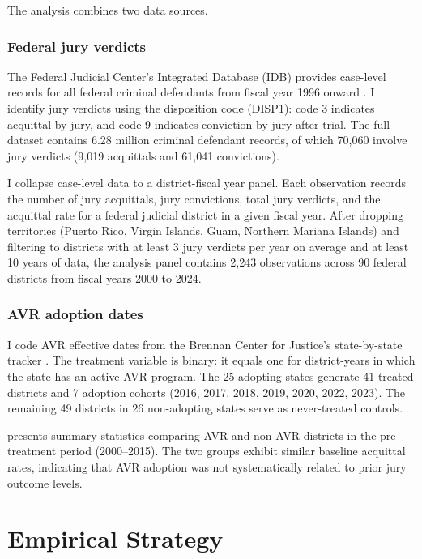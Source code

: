 \documentclass[12pt]{article}
\begin{document}
The analysis combines two data sources.

\subsubsection*{Federal jury verdicts} The Federal Judicial Center's Integrated Database (IDB) provides case-level records for all federal criminal defendants from fiscal year 1996 onward \citep{fjcidb2024}. I identify jury verdicts using the disposition code (DISP1): code 3 indicates acquittal by jury, and code 9 indicates conviction by jury after trial. The full dataset contains 6.28 million criminal defendant records, of which 70,060 involve jury verdicts (9,019 acquittals and 61,041 convictions).

I collapse case-level data to a district-fiscal year panel. Each observation records the number of jury acquittals, jury convictions, total jury verdicts, and the acquittal rate for a federal judicial district in a given fiscal year. After dropping territories (Puerto Rico, Virgin Islands, Guam, Northern Mariana Islands) and filtering to districts with at least 3 jury verdicts per year on average and at least 10 years of data, the analysis panel contains 2,243 observations across 90 federal districts from fiscal years 2000 to 2024.

\subsubsection*{AVR adoption dates} I code AVR effective dates from the Brennan Center for Justice's state-by-state tracker \citep{brennan2023avr}. The treatment variable is binary: it equals one for district-years in which the state has an active AVR program. The 25 adopting states generate 41 treated districts and 7 adoption cohorts (2016, 2017, 2018, 2019, 2020, 2022, 2023). The remaining 49 districts in 26 non-adopting states serve as never-treated controls.



 presents summary statistics comparing AVR and non-AVR districts in the pre-treatment period (2000--2015). The two groups exhibit similar baseline acquittal rates, indicating that AVR adoption was not systematically related to prior jury outcome levels.

\section{Empirical Strategy}
\end{document}
